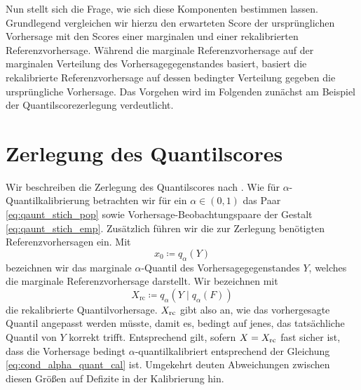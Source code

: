 Nun stellt sich die Frage, wie sich diese Komponenten bestimmen lassen. Grundlegend vergleichen wir hierzu den erwarteten Score der ursprünglichen Vorhersage mit den Scores einer marginalen und einer rekalibrierten Referenzvorhersage. Während die marginale Referenzvorhersage auf der marginalen Verteilung des Vorhersagegegenstandes basiert, basiert die rekalibrierte Referenzvorhersage auf dessen bedingter Verteilung gegeben die ursprüngliche Vorhersage. Das Vorgehen wird im Folgenden zunächst am Beispiel der Quantilscorezerlegung verdeutlicht.

\section{Zerlegung des Quantilscores} \label{seq:decomp_qs}
Wir beschreiben die Zerlegung des Quantilscores nach \textcite{gneiting2023regression}. Wie für $\alpha$-Quantilkalibrierung betrachten wir für ein $\alpha \in (0,1)$ das Paar \eqref{eq:qaunt_stich_pop} sowie Vorhersage-Beobachtungspaare der Gestalt \eqref{eq:qaunt_stich_emp}. Zusätzlich führen wir die zur Zerlegung benötigten Referenzvorhersagen ein. Mit 
\[
x_0 \coloneqq q_\alpha(Y)
\] 
bezeichnen wir das marginale $\alpha$-Quantil des Vorhersagegegenstandes $Y$, welches die marginale Referenzvorhersage darstellt.
Wir bezeichnen mit
\[
X_{\mathrm{rc}} \coloneqq q_\alpha(Y \mid q_\alpha(F))
\]
die rekalibrierte Quantilvorhersage. $X_{\mathrm{rc}}$ gibt also an, wie das vorhergesagte Quantil angepasst werden müsste, damit es, bedingt auf jenes, das tatsächliche Quantil von $Y$ korrekt trifft. Entsprechend gilt, sofern $X=X_{\mathrm{rc}}$ fast sicher ist, dass die Vorhersage bedingt $\alpha$-quantilkalibriert entsprechend der Gleichung \eqref{eq:cond_alpha_quant_cal} ist. Umgekehrt deuten Abweichungen zwischen diesen Größen auf Defizite in der Kalibrierung hin.

